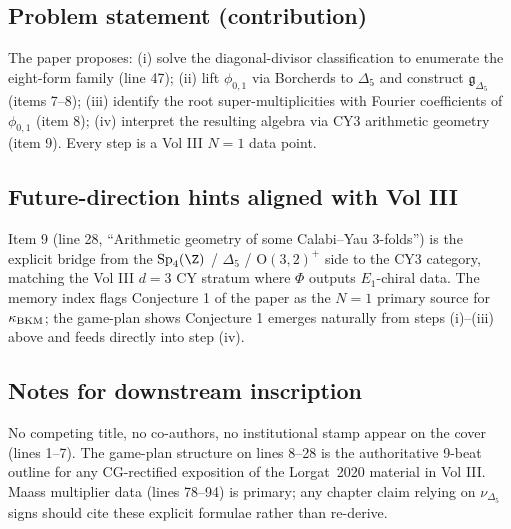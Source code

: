 \subsection*{Problem statement (contribution)}

The paper proposes: (i) solve the diagonal-divisor classification to
enumerate the eight-form family (line 47); (ii) lift $\phi_{0,1}$ via
Borcherds to $\Delta_5$ and construct
$\mathfrak{g}_{\Delta_5}$ (items 7--8); (iii) identify the root
super-multiplicities with Fourier coefficients of $\phi_{0,1}$
(item 8); (iv) interpret the resulting algebra via CY3 arithmetic
geometry (item 9). Every step is a Vol III $N=1$ data point.

\subsection*{Future-direction hints aligned with Vol III}

Item 9 (line 28, ``Arithmetic geometry of some Calabi--Yau 3-folds'')
is the explicit bridge from the $\Sp_4(\Z)$ / $\Delta_5$ /
$\mathrm{O}(3,2)^+$ side to the CY3 category, matching the Vol III
$d=3$ CY stratum where $\Phi$ outputs $E_1$-chiral data. The memory
index flags Conjecture 1 of the paper as the $N=1$ primary source for
$\kappa_{\mathrm{BKM}}$; the game-plan shows Conjecture 1 emerges naturally from
steps (i)--(iii) above and feeds directly into step (iv).

\subsection*{Notes for downstream inscription}

No competing title, no co-authors, no institutional stamp appear on
the cover (lines 1--7). The game-plan structure on lines 8--28 is the
authoritative 9-beat outline for any CG-rectified exposition of the
Lorgat~2020 material in Vol III. Maass multiplier data (lines 78--94)
is primary; any chapter claim relying on $\nu_{\Delta_5}$ signs should
cite these explicit formulae rather than re-derive.
